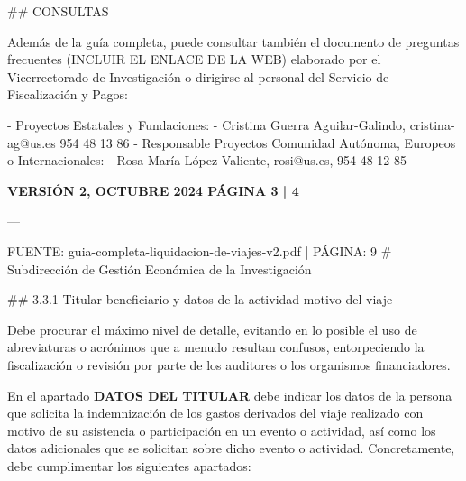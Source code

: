 \documentclass{article}
\begin{document}
\begin{itemize}
\begin{itemize}
\begin{scriptsize}
                  \#\# CONSULTAS

                  Además de la guía completa, puede consultar también el documento de preguntas frecuentes (INCLUIR EL ENLACE DE LA WEB) elaborado por el Vicerrectorado de Investigación o dirigirse al personal del Servicio de Fiscalización y Pagos:

                  - Proyectos Estatales y Fundaciones:
                  - Cristina Guerra Aguilar-Galindo, cristina-ag@us.es 954 48 13 86
                  - Responsable Proyectos Comunidad Autónoma, Europeos o Internacionales:
                  - Rosa María López Valiente, rosi@us.es, 954 48 12 85

                  \textbf{VERSIÓN 2, OCTUBRE 2024        PÁGINA 3 | 4}

                  ---

                  FUENTE: guia-completa-liquidacion-de-viajes-v2.pdf | PÁGINA: 9
                  \# Subdirección de Gestión Económica de la Investigación

                  \#\# 3.3.1 Titular beneficiario y datos de la actividad motivo del viaje

                  Debe procurar el máximo nivel de detalle, evitando en lo posible el uso de abreviaturas o acrónimos que a menudo resultan confusos, entorpeciendo la fiscalización o revisión por parte de los auditores o los organismos financiadores.

                  En el apartado \textbf{DATOS DEL TITULAR} debe indicar los datos de la persona que solicita la indemnización de los gastos derivados del viaje realizado con motivo de su asistencia o participación en un evento o actividad, así como los datos adicionales que se solicitan sobre dicho evento o actividad. Concretamente, debe cumplimentar los siguientes apartados:


\end{scriptsize}
\end{itemize}
\end{itemize}
\end{document}
